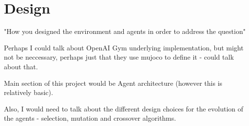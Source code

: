 \chapter{Design}

"How you designed the environment and agents in order to address the question"


Perhaps I could talk about OpenAI Gym underlying implementation, but might not be neccessary, perhaps just that they use mujoco to define it - could talk about that.


Main section of this project would be Agent architecture (however this is relatively basic).

Also, I would need to talk about the different design choices for the evolution of the agents - selection, mutation and crossover algorithms.
